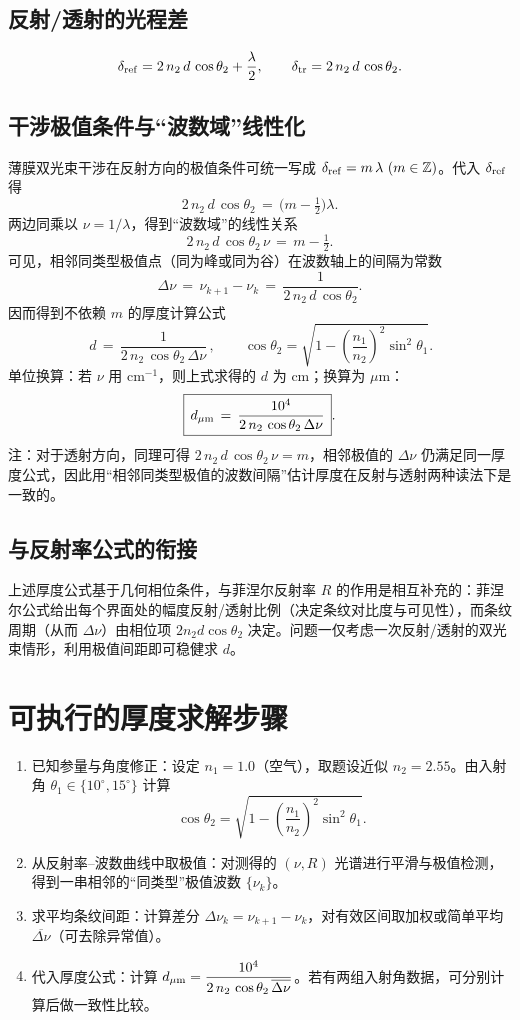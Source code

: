 \documentclass[withoutpreface,bwprint]{cumcmthesis} %
\begin{document}
\subsection{反射/透射的光程差}
\[
    \delta_{\rm ref}=2\,n_2\,d\,\cos\theta_2+\frac{\lambda}{2},\qquad
    \delta_{\rm tr}=2\,n_2\,d\,\cos\theta_2.
\]
\subsection{干涉极值条件与“波数域”线性化}
薄膜双光束干涉在反射方向的极值条件可统一写成 \(\delta_{\rm ref}=m\,\lambda\ (m\in\mathbb{Z})\)。代入 \(\delta_{\rm ref}\) 得
\[
    2\,n_2\,d\,\cos\theta_2 \,=\, \Big(m-\tfrac{1}{2}\Big)\lambda.
\]
两边同乘以 \(\nu=1/\lambda\)，得到“波数域”的线性关系
\[
    2\,n_2\,d\,\cos\theta_2\,\nu \,=\, m-\tfrac{1}{2}.
\]
可见，相邻同类型极值点（同为峰或同为谷）在波数轴上的间隔为常数
\[
    \Delta \nu \,=\, \nu_{k+1}-\nu_k \,=\, \frac{1}{2\,n_2\,d\,\cos\theta_2}.
\]
因而得到不依赖 \(m\) 的厚度计算公式
\[
    \boxed{\,d \,=\, \frac{1}{2\,n_2\,\cos\theta_2\,\Delta \nu}\,},\qquad
    \cos\theta_2=\sqrt{1-\left(\frac{n_1}{n_2}\right)^2\sin^2\theta_1}.
\]
单位换算：若 \(\nu\) 用 cm\(^{-1}\)，则上式求得的 \(d\) 为 cm；换算为 \(\mu\)m：
\[
    \boxed{\,d_{\mu{\rm m}} \,=\, \frac{10^4}{2\,n_2\,\cos\theta_2\,\Delta \nu}\,}.
\]
注：对于透射方向，同理可得 \(2\,n_2\,d\,\cos\theta_2\,\nu=m\)，相邻极值的 \(\Delta\nu\) 仍满足同一厚度公式，因此用“相邻同类型极值的波数间隔”估计厚度在反射与透射两种读法下是一致的。

\subsection{与反射率公式的衔接}
上述厚度公式基于几何相位条件，与菲涅尔反射率 \(R\) 的作用是相互补充的：菲涅尔公式给出每个界面处的幅度反射/透射比例（决定条纹对比度与可见性），而条纹周期（从而 \(\Delta\nu\)）由相位项 \(2n_2 d \cos\theta_2\) 决定。问题一仅考虑一次反射/透射的双光束情形，利用极值间距即可稳健求 \(d\)。

\section{可执行的厚度求解步骤}
\begin{enumerate}
    \item 已知参量与角度修正：设定 \(n_1=1.0\)（空气），取题设近似 \(n_2=2.55\)。由入射角 \(\theta_1 \in \{10^\circ, 15^\circ\}\) 计算
          \[
              \cos\theta_2=\sqrt{1-\left(\frac{n_1}{n_2}\right)^2\sin^2\theta_1}.
          \]
    \item 从反射率–波数曲线中取极值：对测得的 \((\nu, R)\) 光谱进行平滑与极值检测，得到一串相邻的“同类型”极值波数 \(\{\nu_k\}\)。
    \item 求平均条纹间距：计算差分 \(\Delta \nu_k=\nu_{k+1}-\nu_k\)，对有效区间取加权或简单平均 \(\overline{\Delta\nu}\)（可去除异常值）。
    \item 代入厚度公式：计算 \(d_{\mu{\rm m}}=\dfrac{10^4}{2\,n_2\,\cos\theta_2\,\overline{\Delta\nu}}\)。若有两组入射角数据，可分别计算后做一致性比较。
\end{enumerate}
\end{document}
